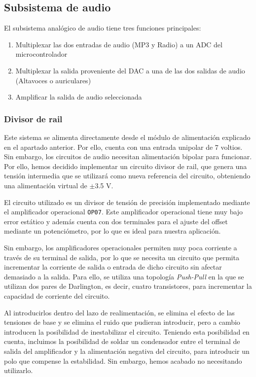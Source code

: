 \clearpage
\subsection{Subsistema de audio}

El subsistema analógico de audio tiene tres funciones principales:
\begin{enumerate}
    \item Multiplexar las dos entradas de audio (MP3 y Radio) a un ADC del microcontrolador
    \item Multiplexar la salida proveniente del DAC a una de las dos salidas de audio (Altavoces o auriculares)
    \item Amplificar la salida de audio seleccionada
\end{enumerate}

\subsubsection{Divisor de rail}
Este sistema se alimenta directamente desde el módulo de alimentación explicado en el apartado anterior. Por ello, cuenta con una entrada unipolar de 7 voltios. Sin embargo, los circuitos de audio necesitan alimentación bipolar para funcionar. Por ello, hemos decidido implementar un circuito divisor de rail, que genera una tensión intermedia que se utilizará como nueva referencia del circuito, obteniendo una alimentación virtual de $\pm$3.5 V.

El circuito utilizado es un divisor de tensión de precisión implementado mediante el amplificador operacional \texttt{OP07}. Este amplificador operacional tiene muy bajo error estático y además cuenta con dos terminales para el ajuste del offset mediante un potenciómetro, por lo que es ideal para nuestra aplicación.

Sin embargo, los amplificadores operacionales permiten muy poca corriente a través de su terminal de salida, por lo que se necesita un circuito que permita incrementar la corriente de salida o entrada de dicho circuito sin afectar demasiado a la salida. Para ello, se utiliza una topología \textit{Push-Pull} en la que se utilizan dos pares de Darlington, es decir, cuatro transistores, para incrementar la capacidad de corriente del circuito. 

Al introducirlos dentro del lazo de realimentación, se elimina el efecto de las tensiones de base y se elimina el ruido que pudieran introducir, pero a cambio introducen la posibilidad de inestabilizar el circuito. Teniendo esta posibilidad en cuenta, incluimos la posibilidad de soldar un condensador entre el terminal de salida del amplificador y la alimentación negativa del circuito, para introducir un polo que compense la estabilidad. Sin embargo, hemos acabado no necesitando utilizarlo. 


